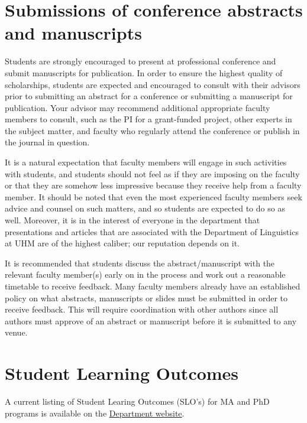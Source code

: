 \documentclass[
]{book}
\begin{document}
\section{Submissions of conference abstracts and manuscripts}\label{submissions-of-conference-abstracts-and-manuscripts}

Students are strongly encouraged to present at professional conference and submit manuscripts for publication. In order to ensure the highest quality of scholarships, students are expected and encouraged to consult with their advisors prior to submitting an abstract for a conference or submitting a manuscript for publication. Your advisor may recommend additional appropriate faculty members to consult, such as the PI for a grant-funded project, other experts in the subject matter, and faculty who regularly attend the conference or publish in the journal in question.

It is a natural expectation that faculty members will engage in such activities with students, and students should not feel as if they are imposing on the faculty or that they are somehow less impressive because they receive help from a faculty member. It should be noted that even the most experienced faculty members seek advice and counsel on such matters, and so students are expected to do so as well. Moreover, it is in the interest of everyone in the department that presentations and articles that are associated with the Department of Linguistics at UHM are of the highest caliber; our reputation depends on it.

It is recommended that students discuss the abstract/manuscript with the relevant faculty member(s) early on in the process and work out a reasonable timetable to receive feedback. Many faculty members already have an established policy on what abstracts, manuscripts or slides must be submitted in order to receive feedback. This will require coordination with other authors since all authors must approve of an abstract or manuscript before it is submitted to any venue.

\section{Student Learning Outcomes}\label{student-learning-outcomes}

A current listing of Student Learing Outcomes (SLO's) for MA and PhD programs is available on the
\href{https://manoa.hawaii.edu/linguistics/graduate-student-learning-outcomes/}{Department website}.
\end{document}
